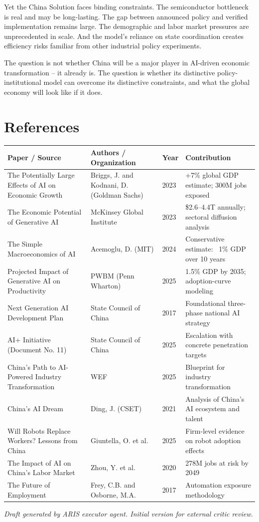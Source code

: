 \documentclass[11pt,a4paper]{article}
\begin{document}
Yet the China Solution faces binding constraints. The semiconductor bottleneck is real and may be long-lasting. The gap between announced policy and verified implementation remains large. The demographic and labor market pressures are unprecedented in scale. And the model's reliance on state coordination creates efficiency risks familiar from other industrial policy experiments.

The question is not whether China will be a major player in AI-driven economic transformation -- it already is. The question is whether its distinctive policy-institutional model can overcome its distinctive constraints, and what the global economy will look like if it does.


\section{References}

\begin{table}[h]
\centering\small
\begin{tabular}{@{llll@}}
\toprule
Paper / Source & Authors / Organization & Year & Contribution \\
\midrule
The Potentially Large Effects of AI on Economic Growth & Briggs, J. and Kodnani, D. (Goldman Sachs) & 2023 & +7\% global GDP estimate; 300M jobs exposed \\
The Economic Potential of Generative AI & McKinsey Global Institute & 2023 & \$2.6--4.4T annually; sectoral diffusion analysis \\
The Simple Macroeconomics of AI & Acemoglu, D. (MIT) & 2024 & Conservative estimate: ~1\% GDP over 10 years \\
Projected Impact of Generative AI on Productivity & PWBM (Penn Wharton) & 2025 & 1.5\% GDP by 2035; adoption-curve modeling \\
Next Generation AI Development Plan & State Council of China & 2017 & Foundational three-phase national AI strategy \\
AI+ Initiative (Document No. 11) & State Council of China & 2025 & Escalation with concrete penetration targets \\
China's Path to AI-Powered Industry Transformation & WEF & 2025 & Blueprint for industry transformation \\
China's AI Dream & Ding, J. (CSET) & 2021 & Analysis of China's AI ecosystem and talent \\
Will Robots Replace Workers? Lessons from China & Giuntella, O. et al. & 2025 & Firm-level evidence on robot adoption effects \\
The Impact of AI on China's Labor Market & Zhou, Y. et al. & 2020 & 278M jobs at risk by 2049 \\
The Future of Employment & Frey, C.B. and Osborne, M.A. & 2017 & Automation exposure methodology \\
\bottomrule
\end{tabular}
\end{table}


\textit{Draft generated by ARIS executor agent. Initial version for external critic review.}
\end{document}
